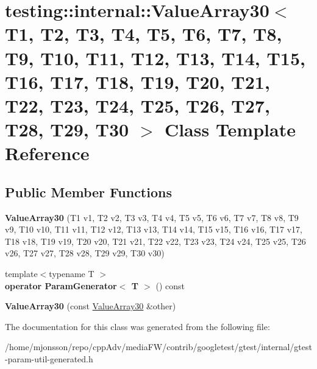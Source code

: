 \hypertarget{classtesting_1_1internal_1_1ValueArray30}{}\section{testing\+:\+:internal\+:\+:Value\+Array30$<$ T1, T2, T3, T4, T5, T6, T7, T8, T9, T10, T11, T12, T13, T14, T15, T16, T17, T18, T19, T20, T21, T22, T23, T24, T25, T26, T27, T28, T29, T30 $>$ Class Template Reference}
\label{classtesting_1_1internal_1_1ValueArray30}
\subsection*{Public Member Functions}
\begin{DoxyCompactItemize}
\item 
\mbox{\label{classtesting_1_1internal_1_1ValueArray30_a8a8f06de5be33b14b9af3593eec9ebc0}} 
{\bfseries Value\+Array30} (T1 v1, T2 v2, T3 v3, T4 v4, T5 v5, T6 v6, T7 v7, T8 v8, T9 v9, T10 v10, T11 v11, T12 v12, T13 v13, T14 v14, T15 v15, T16 v16, T17 v17, T18 v18, T19 v19, T20 v20, T21 v21, T22 v22, T23 v23, T24 v24, T25 v25, T26 v26, T27 v27, T28 v28, T29 v29, T30 v30)
\item 
\mbox{\label{classtesting_1_1internal_1_1ValueArray30_a95aea52bbac9717aedd7432f2b719f77}} 
{\footnotesize template$<$typename T $>$ }\\{\bfseries operator Param\+Generator$<$ T $>$} () const
\item 
\mbox{\label{classtesting_1_1internal_1_1ValueArray30_af27a2f6c2dea95facfbf7e2729f602c2}} 
{\bfseries Value\+Array30} (const \hyperlink{classtesting_1_1internal_1_1ValueArray30}{Value\+Array30} \&other)
\end{DoxyCompactItemize}


The documentation for this class was generated from the following file\+:\begin{DoxyCompactItemize}
\item 
/home/mjonsson/repo/cpp\+Adv/media\+F\+W/contrib/googletest/gtest/internal/gtest-\/param-\/util-\/generated.\+h\end{DoxyCompactItemize}
